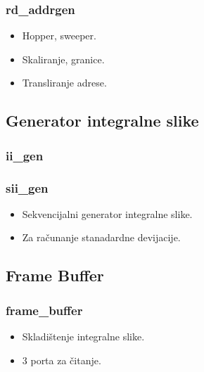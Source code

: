 \documentclass{beamer}
\begin{document}
\begin{frame}
  \frametitle<1->{rd\_addrgen}

  \begin{itemize}
  \item<1-> Hopper, sweeper.
  \item<1-> Skaliranje, granice.
  \item<1-> Transliranje adrese.

  \end{itemize}

  \begin{figure}[H]
    \centering
    \resizebox{0.8\textwidth}{!}{%
         
    }
  \end{figure}

\end{frame}

\subsection{Generator integralne slike}

\begin{frame}
  \frametitle<1-1>{ii\_gen}
  \frametitle<2-2>{sii\_gen}

  \begin{itemize}
  \item<1-1> Sekvencijalni generator integralne slike.
  \item<2-2> Za računanje stanadardne devijacije.

  \end{itemize}

  \begin{figure}[H]
  \end{figure}

\end{frame}

\subsection{Frame Buffer}

\begin{frame}
  \frametitle<1-1>{frame\_buffer}

  \begin{itemize}
  \item<1-1> Skladištenje integralne slike.
  \item<1-1> 3 porta za čitanje.

  \end{itemize}

  \begin{figure}[H]
  \end{figure}
\end{frame}
\end{document}
